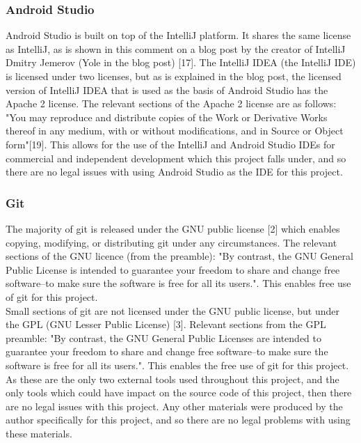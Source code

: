 \documentclass{article}
\begin{document}
\subsubsection{Android Studio}

Android Studio is built on top of the IntelliJ platform. It shares the same license as IntelliJ, as is shown in this comment on a blog post by the creator of IntelliJ Dmitry Jemerov (Yole in the blog post) [17]. The IntelliJ IDEA (the IntelliJ IDE) is licensed under two licenses, but as is explained in the blog post, the licensed version of IntelliJ IDEA that is used as the basis of Android Studio has the Apache 2 license. The relevant sections of the Apache 2 license are as follows: "You may reproduce and distribute copies of the Work or Derivative Works thereof in any medium, with or without modifications, and in Source or Object form"[19]. This allows for the use of the IntelliJ and Android Studio IDEs for commercial and independent development which this project falls under, and so there are no legal issues with using Android Studio as the IDE for this project. \\


\subsubsection{Git}

The majority of git is released under the GNU public license [2] which enables copying, modifying, or distributing git under any circumstances. The relevant sections of the GNU licence (from the preamble): "By contrast, the GNU General Public License is intended to guarantee your freedom to share and change free software--to make sure the software is free for all its users.". This enables free use of git for this project. \\

Small sections of git are not licensed under the GNU public license, but under the GPL (GNU Lesser Public License) [3]. Relevant sections from the GPL preamble: "By contrast, the GNU General Public Licenses are intended to guarantee your freedom to share and change free software--to make sure the software is free for all its users.". This enables the free use of git for this project. \\

As these are the only two external tools used throughout this project, and the only tools which could have impact on the source code of this project, then there are no legal issues with this project. Any other materials were produced by the author specifically for this project, and so there are no legal problems with using these materials. \\
\end{document}
